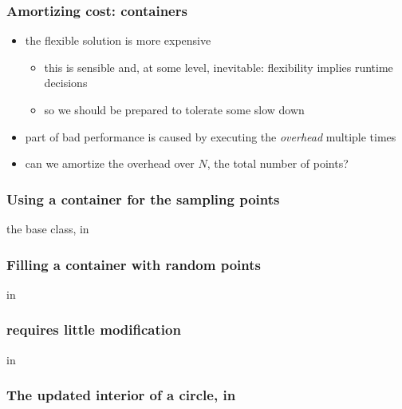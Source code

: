 %
%


\begin{frame}[fragile]
%
  \frametitle{Amortizing cost: containers}
%
  \begin{itemize}
%
  \item the flexible solution is more expensive
    \begin{itemize}
    \item this is sensible and, at some level, inevitable: flexibility implies runtime
      decisions
    \item so we should be prepared to tolerate some slow down
    \end{itemize}
%
  \item part of bad performance is caused by executing the \emph{overhead} multiple times
%
  \item can we amortize the overhead over $N$, the total number of points?
%
  \end{itemize}
%
\end{frame}

\begin{frame}[fragile]
%
  \frametitle{Using a container for the sampling points}
%
  the base class, in 
%
%
\end{frame}

\begin{frame}[fragile]
%
  \frametitle{Filling a container with random points}
%
  in 
%
%
\end{frame}

\begin{frame}[fragile]
%
  \frametitle{ requires little modification}
%
  in 
%
%
\end{frame}

\begin{frame}[fragile]
%
  \frametitle{The updated interior of a circle, in }
%
%
\end{frame}

